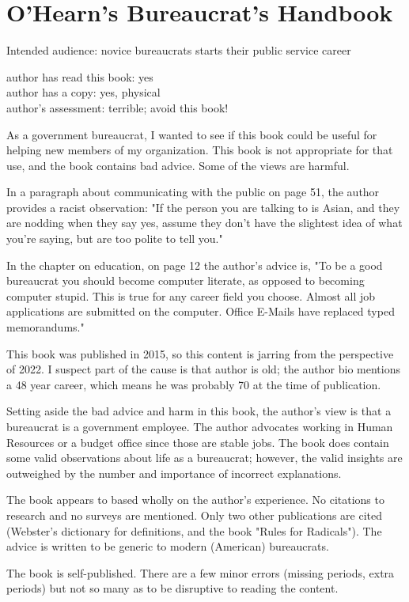 \section{O'Hearn's Bureaucrat's Handbook\label{review:ohearn_handbook}}

\cite{2015_OHearn}

Intended audience: novice bureaucrats starts their public service career

author has read this book: yes\\
author has a copy: yes, physical\\
author's assessment: terrible; avoid this book!


As a government bureaucrat, I wanted to see if this book could be useful for helping new members of my organization. This book is not appropriate for that use, and the book contains bad advice. Some of the views are harmful. 



In a paragraph about communicating with the public on page 51, the author provides a racist observation: "If the person you are talking to is Asian, and they are nodding when they say yes, assume they don't have the slightest idea of what you're saying, but are too polite to tell you."



In the chapter on education, on page 12 the author's advice is, "To be a good bureaucrat you should become computer literate, as opposed to becoming computer stupid. This is true for any career field you choose. Almost all job applications are submitted on the computer. Office E-Mails have replaced typed memorandums." 



This book was published in 2015, so this content is jarring from the perspective of 2022. I suspect part of the cause is that author is old; the author bio mentions a 48 year career, which means he was probably 70 at the time of publication. 



Setting aside the bad advice and harm in this book, the author's view is that a bureaucrat is a government employee. The author advocates working in Human Resources or a budget office since those are stable jobs. The book does contain some valid observations about life as a bureaucrat; however, the valid insights are outweighed by the number and importance of incorrect explanations. 



The book appears to based wholly on the author's experience. No citations to research and no surveys are mentioned. Only two other publications are cited (Webster's dictionary for definitions, and the book "Rules for Radicals").  The advice is written to be generic to modern (American) bureaucrats. 



The book is self-published. There are a few minor errors (missing periods, extra periods) but not so many as to be disruptive to reading the content. 

